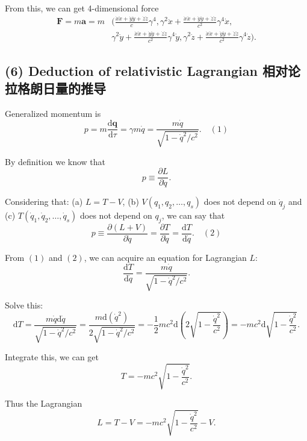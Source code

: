 From this, we can get 4-dimensional force \begin{align*}
    \boldsymbol{F} = m \boldsymbol{a} = m & \biggl(  \frac{\dot{x} \ddot{x} + \dot{y} \ddot{y} + \dot{z} \ddot{z}}{c} \gamma^4, \gamma^2 \ddot{x} + \frac{\dot{x} \ddot{x} + \dot{y} \ddot{y} + \dot{z} \ddot{z}}{c^2} \gamma^4 \dot{x}, \\
    & \gamma^2 \ddot{y} + \frac{\dot{x} \ddot{x} + \dot{y} \ddot{y} + \dot{z} \ddot{z}}{c^2} \gamma^4 \dot{y}, \gamma^2 \ddot{z} + \frac{\dot{x} \ddot{x} + \dot{y} \ddot{y} + \dot{z} \ddot{z}}{c^2} \gamma^4 \dot{z} \biggr).
\end{align*}

\subsection*{(6) Deduction of relativistic Lagrangian
相对论拉格朗日量的推导}\label{deduction-of-relativistic-lagrangian-ux76f8ux5bf9ux8bbaux62c9ux683cux6717ux65e5ux91cfux7684ux63a8ux5bfc}

Generalized momentum is
\[p = m \frac{\mathrm{d} \boldsymbol{q}}{\mathrm{d} \tau} = \gamma m \dot{q} = \frac{m \dot{q}}{\sqrt{1 - \dot{q}^2 / c^2}}. \quad(1)\]

By definition we know that
\[p \equiv \frac{\partial L}{\partial \dot{q}}.\]

Considering that: (a) \(L = T - V\), (b) \(V(q_1, q_2, \dots, q_s)\)
does not depend on \(\dot{q}_j\) and (c)
\(T(\dot{q}_1, \dot{q}_2, \dots, \dot{q}_s)\) does not depend on
\(q_j\), we can say that
\[p \equiv \frac{\partial \left( L + V \right)}{\partial \dot{q}} = \frac{\partial T}{\partial \dot{q}} = \frac{\mathrm{d} T}{\mathrm{d} \dot{q}}. \quad(2)\]

From \((1)\) and \((2)\), we can acquire an equation for Lagrangian
\(L\):
\[\frac{\mathrm{d} T}{\mathrm{d} \dot{q}} = \frac{m \dot{q}}{\sqrt{1 - \dot{q}^2 / c^2}}.\]

Solve this:
\[\mathrm{d} T = \frac{m \dot{q} \mathrm{d} \dot{q}}{\sqrt{1 - \dot{q}^2 / c^2}} = \frac{m \mathrm{d}\left( \dot{q}^2 \right)}{2 \sqrt{1 - \dot{q}^2 / c^2}} = - \frac{1}{2} mc^2 \mathrm{d} \left( 2 \sqrt{1 - \frac{\dot{q}^2}{c^2}} \right) = - mc^2 \mathrm{d} \sqrt{1 - \frac{\dot{q}^2}{c^2}}.\]

Integrate this, we can get
\[T = - mc^2 \sqrt{1 - \frac{\dot{q}^2}{c^2}}.\]

Thus the Lagrangian
\[L = T - V = - mc^2 \sqrt{1 - \frac{\dot{q}^2}{c^2}} - V.\]


